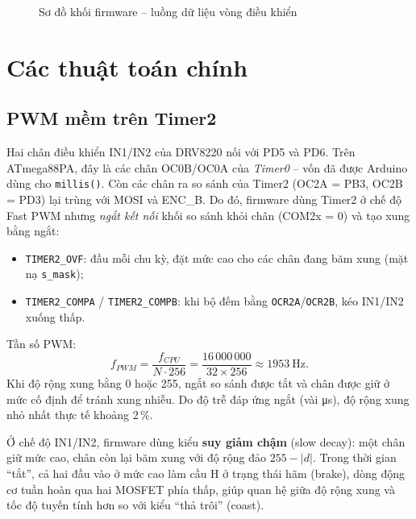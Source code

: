 \begin{figure}[H]
{}
\caption{Sơ đồ khối firmware -- luồng dữ liệu vòng điều khiển}
\label{fig:fwblock}
\end{figure}

\section{Các thuật toán chính}

\subsection{PWM mềm trên Timer2}
\label{sec:swpwm}
Hai chân điều khiển IN1/IN2 của DRV8220 nối với PD5 và PD6. Trên ATmega88PA, đây là các chân OC0B/OC0A của \emph{Timer0} -- vốn đã được Arduino dùng cho \texttt{millis()}. Còn các chân ra so sánh của Timer2 (OC2A = PB3, OC2B = PD3) lại trùng với MOSI và ENC\_B. Do đó, firmware dùng Timer2 ở chế độ Fast PWM nhưng \emph{ngắt kết nối} khối so sánh khỏi chân (COM2x = 0) và tạo xung bằng ngắt:
\begin{itemize}
  \item \texttt{TIMER2\_OVF}: đầu mỗi chu kỳ, đặt mức cao cho các chân đang băm xung (mặt nạ \texttt{s\_mask});
  \item \texttt{TIMER2\_COMPA} / \texttt{TIMER2\_COMPB}: khi bộ đếm bằng \texttt{OCR2A}/\texttt{OCR2B}, kéo IN1/IN2 xuống thấp.
\end{itemize}
Tần số PWM:
\begin{equation}
  f_{PWM}=\frac{f_{CPU}}{N\cdot256}=\frac{16\,000\,000}{32\times256}\approx\SI{1953}{\hertz}.
\end{equation}
Khi độ rộng xung bằng 0 hoặc 255, ngắt so sánh được tắt và chân được giữ ở mức cố định để tránh xung nhiễu. Do độ trễ đáp ứng ngắt (vài \si{\micro\second}), độ rộng xung nhỏ nhất thực tế khoảng 2\,\%.

Ở chế độ IN1/IN2, firmware dùng kiểu \textbf{suy giảm chậm} (slow decay): một chân giữ mức cao, chân còn lại băm xung với độ rộng đảo $255-|d|$. Trong thời gian ``tắt'', cả hai đầu vào ở mức cao làm cầu H ở trạng thái hãm (brake), dòng động cơ tuần hoàn qua hai MOSFET phía thấp, giúp quan hệ giữa độ rộng xung và tốc độ tuyến tính hơn so với kiểu ``thả trôi'' (coast).

